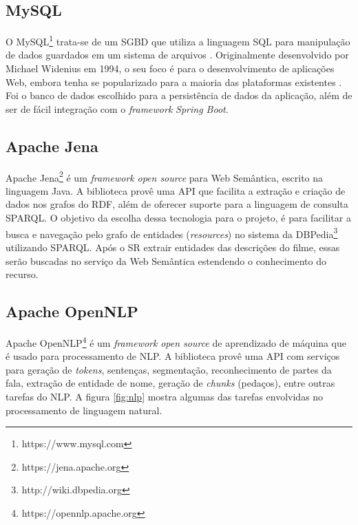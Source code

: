 \subsection{MySQL}

O MySQL\footnote{https://www.mysql.com} trata-se de um \ac{SGBD} que utiliza a linguagem \ac{SQL} para manipulação de dados guardados em um sistema de arquivos \citep{MySQLSGBD}. Originalmente desenvolvido por Michael Widenius em 1994, o seu foco é para o desenvolvimento de aplicações Web, embora tenha se popularizado para a maioria das plataformas existentes \citep{MySQLDevelopers}. Foi o banco de dados escolhido para a persistência de dados da aplicação, além de ser de fácil integração com o \textit{framework} \textit{Spring Boot}.

\subsection{Apache Jena}

Apache Jena\footnote{https://jena.apache.org} é um \textit{framework} \textit{open source} para Web Semântica, escrito na linguagem Java. A biblioteca provê uma \ac{API} que facilita a extração e criação de dados nos grafos  do \ac{RDF}, além de oferecer suporte para a linguagem de consulta \ac{SPARQL}. O objetivo da escolha dessa tecnologia para o projeto, é para facilitar a busca e navegação pelo grafo de entidades (\textit{resources}) no sistema da DBPedia\footnote{http://wiki.dbpedia.org} utilizando \ac{SPARQL}. Após o \ac{SR} extrair entidades das descrições do filme, essas serão buscadas no serviço da Web Semântica estendendo o conhecimento do recurso.

\subsection{Apache OpenNLP}

Apache OpenNLP\footnote{https://opennlp.apache.org} é um \textit{framework} \textit{open source} de aprendizado de máquina que é usado para processamento de \ac{NLP}. A biblioteca provê uma \ac{API} com serviços para geração de \textit{tokens}, sentenças, segmentação, reconhecimento de partes da fala, extração de entidade de nome, geração de \textit{chunks} (pedaços), entre outras tarefas do \ac{NLP}. A figura \ref{fig:nlp} mostra algumas das tarefas envolvidas no processamento de linguagem natural.

